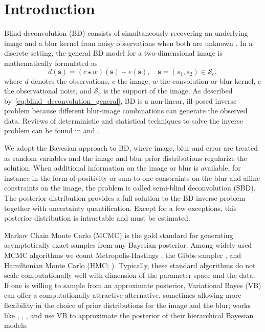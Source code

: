 \documentclass[12pt]{article}
\begin{document}
{} %


\section{Introduction}
Blind deconvolution (BD) consists of simultaneously recovering an underlying  image and a blur kernel from noisy observations when both are unknown \citep{Campisi2007}. In a discrete setting, the general BD model for a two-dimensional image is mathematically formulated as
\begin{equation} \label{eq:blind_deconvolution_general}
    d(\bm{s}) = (c \star w)(\bm{s}) + e(\bm{s}), \quad  \bm{s} = (s_1, s_2) \in \mathcal{S}_c,
\end{equation}
where $d$ denotes the observations, $c$ the image, $w$ the convolution or blur kernel, $e$ the observational noise, and $\mathcal{S}_c$ is the support of the image.
As described by~\eqref{eq:blind_deconvolution_general}, BD is a non-linear, ill-posed inverse problem because different blur-image combinations can generate the observed data. Reviews of deterministic and statistical techniques to solve the inverse problem can be found in \citet{levin2011understanding} and \citet{chaudhuri2014blind}.

We adopt the Bayesian approach to BD, where image, blur and error are treated as random variables and the image and blur prior distributions regularize the solution. When additional information on the image or blur is available, for instance in the form of positivity or sum-to-one constraints on the blur and affine constraints on the image, the problem is called semi-blind deconvolution (SBD). The posterior distribution provides a full solution to the BD inverse problem together with uncertainty quantification. Except for a few exceptions, this posterior distribution is intractable and must be estimated.

Markov Chain Monte Carlo (MCMC) is the gold standard for generating asymptotically exact samples from any Bayesian posterior. Among widely used MCMC algorithms we count Metropolis-Hastings \citep{metropolis1953equation,Hastings1970}, the Gibbs sampler \citep{GemanGeman1984}, and Hamiltonian Monte Carlo (HMC; \citet{Duane1987}). Typically, these standard algorithms do not scale computationally well with dimension of the parameter space and the data. If one is willing to sample from an approximate posterior, Variational Bayes (VB) can offer a computationally attractive alternative, sometimes allowing more flexibility in the choice of prior distributions for the image and the blur; works like \citet{babacan2012bayesian}, \citet{molina2006}, \citet{likas2004}, and \citet{Tzikas2009} use VB to approximate the posterior of their hierarchical Bayesian models.
\end{document}
